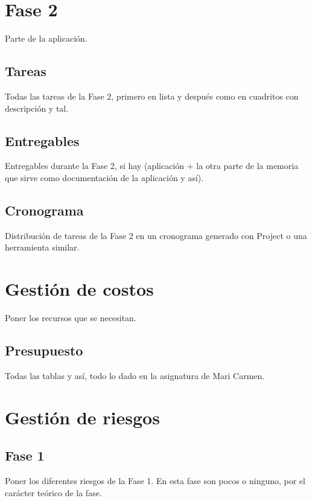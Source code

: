 
\section{Fase 2}
{\color{red} Parte de la aplicación.}

\subsection{Tareas}
{\color{red} Todas las tareas de la Fase 2, primero en lista y después como en cuadritos con descripción y tal.}

\subsection{Entregables}
{\color{red} Entregables durante la Fase 2, si hay (aplicación + la otra parte de la memoria que sirve como documentación de la aplicación y así).}

\subsection{Cronograma}
{\color{red} Distribución de tareas de la Fase 2 en un cronograma generado con Project o una herramienta similar.}


\section{Gestión de costos}
{\color{red} Poner los recursos que se necesitan.}

\subsection{Presupuesto}
{\color{red} Todas las tablas y así, todo lo dado en la asignatura de Mari Carmen.}


\section{Gestión de riesgos}

\subsection{Fase 1}
{\color{red} Poner los diferentes riesgos de la Fase 1. En esta fase son pocos o ninguno, por el carácter teórico de la fase.}

